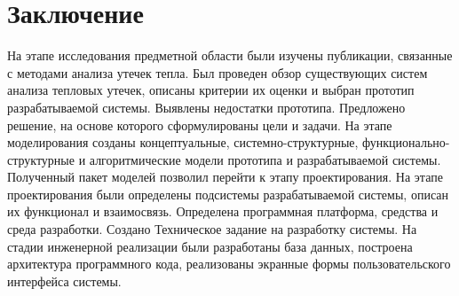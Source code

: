 {
	\titleformat{\section}[block]{\centering\normalfont\large\bfseries}{\thesection}{10pt}{}
	\section*{\centering Заключение}
}

\par
	На этапе исследования предметной области были изучены публикации, связанные с методами анализа утечек тепла. Был проведен обзор существующих систем анализа тепловых утечек, описаны критерии их оценки и выбран прототип разрабатываемой системы. Выявлены недостатки прототипа. Предложено решение, на основе которого сформулированы цели и задачи. На этапе моделирования созданы концептуальные, системно-структурные, функционально-структурные и алгоритмические модели прототипа и разрабатываемой системы. Полученный пакет моделей позволил перейти к этапу проектирования.
	На этапе проектирования были определены подсистемы разрабатываемой системы, описан их функционал и взаимосвязь. Определена программная платформа, средства и среда разработки. Создано Техническое задание на разработку системы. На стадии инженерной реализации были разработаны база данных, построена архитектура программного кода, реализованы экранные формы пользовательского интерфейса системы.